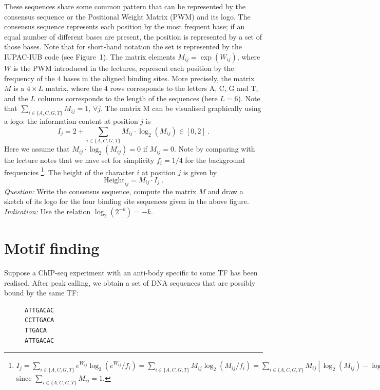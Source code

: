 \documentclass[a4paper,11pt]{article}
\begin{document}
\noindent These sequences share some common pattern that can be represented by the consensus sequence or the Positional Weight Matrix (PWM) and its logo. The consensus sequence represents each position by the most frequent base; if an equal number of different bases are present, the position is represented by a set of those bases. Note that for short-hand notation the set is represented by the IUPAC-IUB code (see Figure~1).  The matrix elements $M_{ij} = \exp(W_{ij})$, where $W$ is the PWM introduced in the lectures, represent each position by the frequency of the 4 bases in the aligned binding sites. More precisely, the matrix $M$ is a $4 \times L$ matrix, where the $4$ rows corresponds to the letters A, C, G and T, and the $L$ columns corresponds to the length of the sequences (here $L=6$). Note that $\sum_{i \in \{A, C, G, T\}} M_{ij} = 1$, $\forall j$. The matrix M can be visualised graphically using a logo: the information content at position $j$ is
$$
I_j = 2 + \sum_{i \in \{A, C, G, T\}} M_{ij} \cdot \log_2(M_{ij}) \in [0,2] ~.
$$
Here we assume that $M_{ij} \cdot \log_2(M_{ij})=0$ if $M_{ij}=0$. Note by comparing with the lecture notes that we have set for simplicity $f_i = 1/4$ for the background frequencies \footnote{$I_j = \sum_{i \in \{A, C, G, T\}} e^{W_{ij}} \log_2(e^{W_{ij}}/f_i)  = \sum_{i \in \{A, C, G, T\}} M_{ij} \log_2(M_{ij}/f_i) = \sum_{i \in \{A, C, G, T\}} M_{ij} [\log_2(M_{ij}) - \log_2(f_i)] = \sum_{i \in \{A, C, G, T\}} M_{ij} [\log_2(M_{ij}) + 2] = 2 + \sum_{i \in \{A, C, G, T\}} M_{ij} \cdot \log_2(M_{ij})$ since $\sum_{i \in \{A, C, G, T\}} M_{ij} = 1$.}. The height of the character $i$ at position $j$ is given by 
$$
\mbox{Height}_{ij} = M_{ij} \cdot I_j~.
$$
\noindent \textit{Question:} Write the consensus sequence, compute the matrix $M$ and draw a sketch of its logo for the four binding site sequences given in the above figure.\\

\noindent \textit{Indication:} Use the relation $\log_2(2^{-k})=-k$.

\newpage
\section{Motif finding}

\noindent Suppose a ChIP-seq experiment with an anti-body specific to some TF has been realised. After peak calling, we obtain a set of DNA sequences that are possibly bound by the same TF:

\begin{figure}[h!]
\centering
\begin{BVerbatim}
ATTGACAC
CCTTGACA
TTGACA
ATTGACAC
\end{BVerbatim}
\end{figure}
\end{document}
